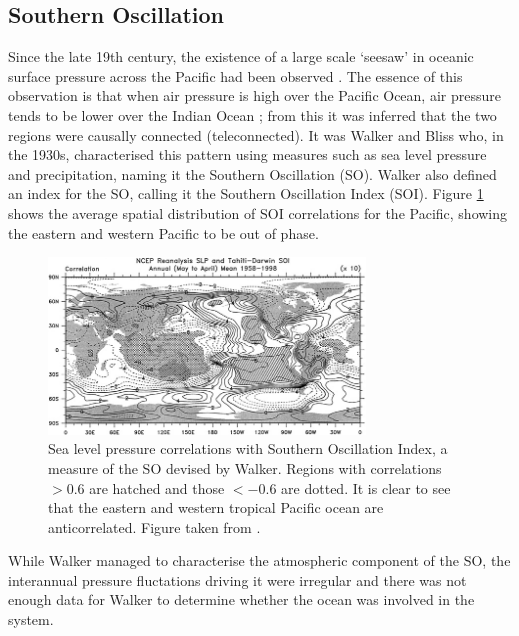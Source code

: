 \subsection{Southern Oscillation}
Since the late 19th century, the existence of a large scale `seesaw' in oceanic
surface pressure across the Pacific had been observed \citep{trenberth2000}. The
essence of this observation is that when air pressure is high over the Pacific
Ocean, air pressure tends to be lower over the Indian Ocean
\citep{philander1990}; from this it was inferred that the two regions were
causally connected (teleconnected). It was Walker and Bliss who, in the 1930s,
characterised this pattern using measures such as sea level pressure and
precipitation, naming it the Southern Oscillation (SO). Walker also defined an
index for the SO, calling it the Southern Oscillation Index (SOI). Figure
\ref{fig:slp_corr} shows the average spatial distribution of SOI correlations
for the Pacific, showing the eastern and western Pacific to be out of phase.

\begin{figure}
  \centering
  \includegraphics[width=0.75\textwidth]{figures/slp_corr}
  \caption{Sea level pressure correlations with Southern Oscillation Index, a
    measure of the SO devised by Walker. Regions with correlations $>0.6$ are
    hatched and those $<-0.6$ are dotted. It is clear to see that the eastern
    and western tropical Pacific ocean are anticorrelated. Figure taken from
    \cite{trenberth2000}.
  }
  \label{fig:slp_corr}
\end{figure}

While Walker managed to characterise the atmospheric component of the SO, the
interannual pressure fluctations driving it were irregular and there was not
enough data for Walker to determine whether the ocean was involved in the
system.

